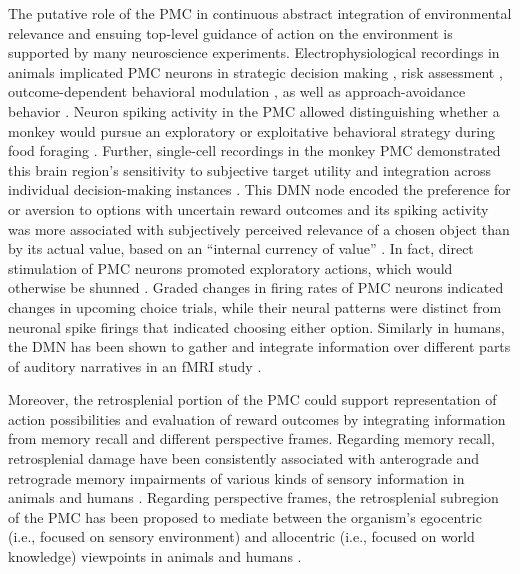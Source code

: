 \documentclass[10pt,letterpaper]{article}
\begin{document}
The putative role of the PMC in continuous abstract integration of
environmental relevance
and ensuing top-level guidance of action on the environment is supported
by many neuroscience experiments.
Electrophysiological recordings in animals implicated PMC neurons in
strategic decision making \citep{pearson2009neurons},
risk assessment \citep{mccoy2005risk},
outcome-dependent behavioral modulation \citep{hayden2009electrophysiological},
as well as approach-avoidance behavior
\citep{vann2009does}.
Neuron spiking activity in the PMC allowed distinguishing
whether a monkey would pursue an exploratory or exploitative
behavioral strategy during food foraging \citep{pearson2009neurons}.
Further, single-cell recordings in the monkey PMC
demonstrated this brain region's sensitivity to
subjective target utility \citep{mccoy2005risk} and integration
across individual decision-making instances \citep{pearson2009neurons}.
This DMN node encoded the
preference for or aversion to options with uncertain reward outcomes
and its spiking activity was more associated with
subjectively perceived relevance of a chosen object
than by its actual value,
based on an ``internal currency of value'' \citep{mccoy2005risk}.
In fact, direct stimulation of PMC neurons
promoted exploratory actions,
which would otherwise be shunned \citep{hayden2008stim}.
Graded changes in firing rates of PMC neurons
indicated changes in upcoming choice trials, while their neural patterns were
distinct from neuronal spike firings that indicated choosing either option.
Similarly in humans,
the DMN has been shown to gather and integrate information
over different parts of auditory narratives in an fMRI study
\citep{simony2016dynamic}.


Moreover, the retrosplenial portion of the PMC could support
representation of action possibilities
and evaluation of reward outcomes by integrating
information from memory recall and different perspective frames.
Regarding memory recall, retrosplenial damage have been
consistently associated with anterograde and retrograde memory impairments
of various kinds of sensory information
in animals and humans
\citep{vann2009does}.
Regarding perspective frames, the retrosplenial subregion of the PMC has been
proposed to mediate between the organism's egocentric
(i.e., focused on sensory environment) and
allocentric (i.e., focused on world knowledge) viewpoints
in animals and humans
\citep{epstein2008parahippocampal, burgess2008spatial, valiquette2007different}.
\end{document}
